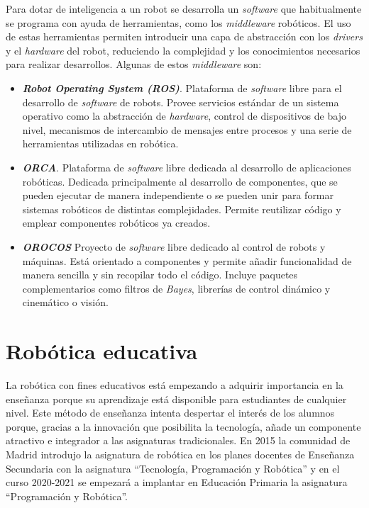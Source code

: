 Para dotar de inteligencia a un robot se desarrolla un \textit{software} que habitualmente se programa con ayuda de herramientas, como los \textit{middleware} robóticos. El uso de estas herramientas permiten introducir una capa de abstracción con los \textit{drivers} y el \textit{hardware} del robot, reduciendo la complejidad y los conocimientos necesarios para realizar desarrollos. Algunas de estos \textit{middleware} son: 
\begin{itemize}
    \item \textit{\textbf{Robot Operating System (ROS)}}\cite{bib:ros}. Plataforma de \textit{software} libre para el desarrollo de \textit{software} de robots. Provee servicios estándar de un sistema operativo como la abstracción de \textit{hardware}, control de dispositivos de bajo nivel, mecanismos de intercambio de mensajes entre procesos y una serie de herramientas utilizadas en robótica. 
    \item \textit{\textbf{ORCA}}\cite{bib:orca}. Plataforma de \textit{software} libre dedicada al desarrollo de aplicaciones robóticas. Dedicada principalmente al desarrollo de componentes, que se pueden ejecutar de manera independiente o se pueden unir para formar sistemas robóticos de distintas complejidades. Permite reutilizar código y emplear componentes robóticos ya creados.
     \item \textit{\textbf{OROCOS}}\cite{bib:orocos} Proyecto de \textit{software} libre dedicado al control de robots y máquinas. Está orientado a componentes y permite añadir funcionalidad de manera sencilla y sin recopilar todo el código. Incluye paquetes complementarios como filtros de \textit{Bayes}, librerías de control dinámico y cinemático o visión.
\end{itemize}

\section{Robótica educativa}
\label{sec:educativa}
La robótica con fines educativos está empezando a adquirir importancia en la enseñanza porque su aprendizaje está disponible para estudiantes de cualquier nivel. Este método de enseñanza intenta despertar el interés de los alumnos porque, gracias a la innovación que posibilita la tecnología, añade un componente atractivo e integrador a las asignaturas tradicionales. En 2015 la comunidad de Madrid introdujo la asignatura de robótica en los planes docentes de Enseñanza Secundaria con la asignatura ``Tecnología, Programación y Robótica''\cite{bib:secundaria} y en el curso 2020-2021 se empezará a implantar en Educación Primaria la asignatura ``Programación y Robótica''\cite{bib:primaria}.\\

